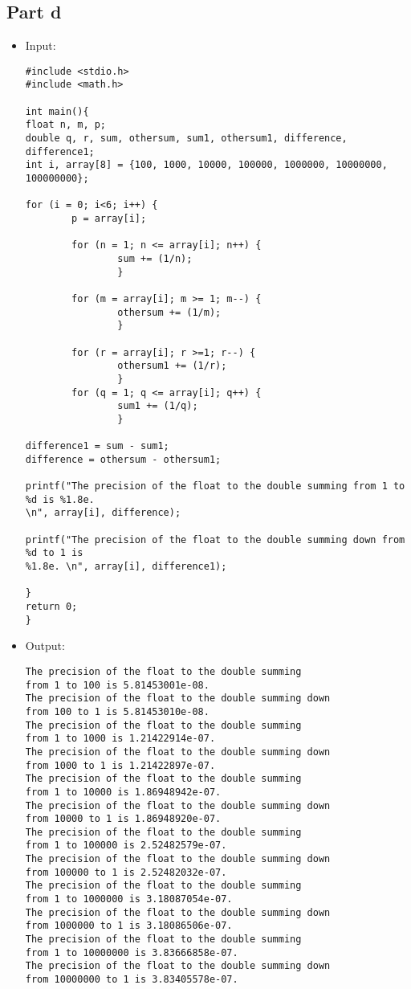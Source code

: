 \documentclass[10pt]{article}
\begin{document}
\subsection{Part d}
\begin{itemize}
\item Input:
\begin{verbatim}
#include <stdio.h>
#include <math.h>

int main(){
float n, m, p;
double q, r, sum, othersum, sum1, othersum1, difference, difference1;
int i, array[8] = {100, 1000, 10000, 100000, 1000000, 10000000, 100000000};

for (i = 0; i<6; i++) {
        p = array[i];
        
        for (n = 1; n <= array[i]; n++) {
                sum += (1/n);
                }

        for (m = array[i]; m >= 1; m--) {
                othersum += (1/m);
                }

        for (r = array[i]; r >=1; r--) {
                othersum1 += (1/r);
                }
        for (q = 1; q <= array[i]; q++) {
                sum1 += (1/q);
                }

difference1 = sum - sum1;
difference = othersum - othersum1;

printf("The precision of the float to the double summing from 1 to %d is %1.8e. 
\n", array[i], difference);	

printf("The precision of the float to the double summing down from %d to 1 is 
%1.8e. \n", array[i], difference1);

}
return 0;
}
\end{verbatim}
\item Output:
\begin{verbatim}
The precision of the float to the double summing 
from 1 to 100 is 5.81453001e-08. 
The precision of the float to the double summing down 
from 100 to 1 is 5.81453010e-08. 
The precision of the float to the double summing 
from 1 to 1000 is 1.21422914e-07. 
The precision of the float to the double summing down 
from 1000 to 1 is 1.21422897e-07. 
The precision of the float to the double summing 
from 1 to 10000 is 1.86948942e-07. 
The precision of the float to the double summing down
from 10000 to 1 is 1.86948920e-07. 
The precision of the float to the double summing 
from 1 to 100000 is 2.52482579e-07. 
The precision of the float to the double summing down 
from 100000 to 1 is 2.52482032e-07. 
The precision of the float to the double summing 
from 1 to 1000000 is 3.18087054e-07. 
The precision of the float to the double summing down 
from 1000000 to 1 is 3.18086506e-07. 
The precision of the float to the double summing 
from 1 to 10000000 is 3.83666858e-07. 
The precision of the float to the double summing down 
from 10000000 to 1 is 3.83405578e-07. 
\end{verbatim}
\end{itemize}
\end{document}
